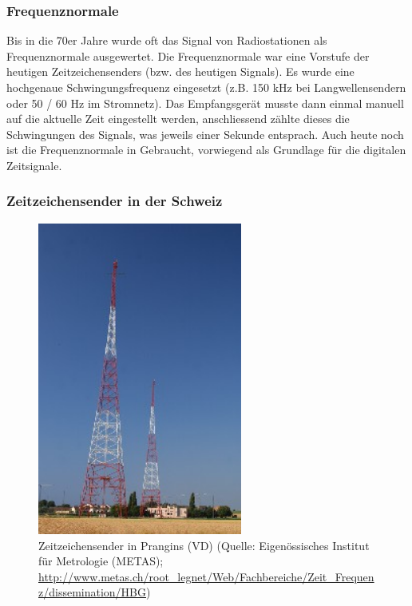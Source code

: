 \subsubsection{Frequenznormale}
Bis in die 70er Jahre wurde oft das Signal von Radiostationen als Frequenznormale ausgewertet. Die Frequenznormale war eine Vorstufe der heutigen Zeitzeichensenders (bzw. des heutigen Signals). Es wurde eine hochgenaue Schwingungsfrequenz eingesetzt (z.B. 150 kHz bei Langwellensendern oder 50 / 60 Hz im Stromnetz). Das Empfangsgerät musste dann einmal manuell auf die aktuelle Zeit eingestellt werden, anschliessend zählte dieses die Schwingungen des Signals, was jeweils einer Sekunde entsprach. Auch heute noch ist die Frequenznormale in Gebraucht, vorwiegend als Grundlage für die digitalen Zeitsignale.

\subsubsection{Zeitzeichensender in der Schweiz}

\begin{figure}
  \begin{center}
    \includegraphics[width=0.6\textwidth]{./images/Analyse/Prangings_VD_CH.jpg}
  \end{center}
  \caption[Zeitzeichensender in Prangins (VD)]{Zeitzeichensender in Prangins (VD) (Quelle: Eigenössisches Institut für Metrologie (METAS); \url{http://www.metas.ch/root_legnet/Web/Fachbereiche/Zeit_Frequenz/dissemination/HBG})} 
\end{figure}

